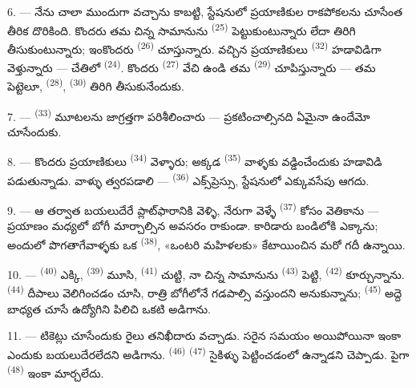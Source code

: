6. --- నేను చాలా ముందుగా వచ్చాను కాబట్టి, స్టేషనులో ప్రయాణికుల రాకపోకలను చూసేంత తీరిక
దొరికింది. కొందరు తమ చిన్న సామానును  \textsuperscript{(25)}
పెట్టుకుంటున్నారు లేదా తిరిగి తీసుకుంటున్నారు; ఇంకొందరు 
\textsuperscript{(26)} చూస్తున్నారు. వచ్చిన ప్రయాణికులు 
\textsuperscript{(32)} హడావిడిగా వెళ్తున్నారు — చేతిలో 
\textsuperscript{(24)}. కొందరు  \textsuperscript{(27)} వేచి ఉండి
తమ  \textsuperscript{(29)} చూపిస్తున్నారు — తమ పెట్టెలూ, 
\textsuperscript{(28)},  \textsuperscript{(30)} తిరిగి తీసుకునేందుకు.

7. ---  \textsuperscript{(33)} మూటలను జాగ్రత్తగా పరిశీలించారు —
ప్రకటించాల్సినది ఏమైనా ఉందేమో చూసేందుకు.

8. --- కొందరు ప్రయాణికులు  \textsuperscript{(34)} వెళ్ళారు; అక్కడ
 \textsuperscript{(35)} వాళ్ళకు వడ్డించేందుకు హడావిడి పడుతున్నాడు. వాళ్ళు
త్వరపడాలి —  \textsuperscript{(36)} ఎక్స్‌ప్రెస్సు, స్టేషనులో ఎక్కువసేపు
ఆగదు.

9. --- ఆ తర్వాత బయలుదేరే ప్లాట్‌ఫారానికి వెళ్ళి, నేరుగా వెళ్ళే 
\textsuperscript{(37)} కోసం వెతికాను — ప్రయాణం మధ్యలో బోగీ మార్చాల్సిన అవసరం రాకుండా.
కారిడారు బండిలోకి ఎక్కాను; అందులో పొగతాగేవాళ్ళకు ఒక  \textsuperscript{(38)},
«ఒంటరి మహిళలకు» కేటాయించిన మరో గదీ ఉన్నాయి.

\VUsaut{3.0mm}

10. ---  \textsuperscript{(40)} ఎక్కి, 
\textsuperscript{(39)} మూసి,  \textsuperscript{(41)} చుట్టి, నా చిన్న
సామానును  \textsuperscript{(43)} పెట్టి, 
\textsuperscript{(42)} కూర్చున్నాను.  \textsuperscript{(44)}
దీపాలు వెలిగించడం చూసి, రాత్రి బోగీలోనే గడపాల్సి వస్తుందని అనుకున్నాను;
 \textsuperscript{(45)} అద్దె బాధ్యత చూసే ఉద్యోగిని పిలిచి ఒకటి అడిగాను.

11. --- టికెట్లు చూసేందుకు రైలు తనిఖీదారు వచ్చాడు. సరైన సమయం అయిపోయినా ఇంకా ఎందుకు
బయలుదేరలేదని అడిగాను.  \textsuperscript{(46)} 
\textsuperscript{(47)} సైకిళ్ళు పెట్టించడంలో ఉన్నాడని చెప్పాడు. పైగా
 \textsuperscript{(48)} ఇంకా మార్చలేదు.

